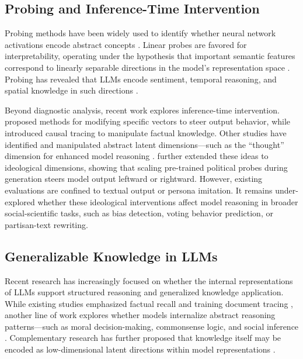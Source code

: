 \documentclass[11pt]{article}
\begin{document}
\subsection{Probing and Inference-Time Intervention}

Probing methods have been widely used to identify whether neural network activations encode abstract concepts \citep{alainUnderstandingIntermediateLayers2016, belinkovProbingClassifiersPromises2022}. Linear probes are favored for interpretability, operating under the hypothesis that important semantic features correspond to linearly separable directions in the model’s representation space \citep{mikolov-etal-2013-linguistic, parkLinearRepresentationHypothesis2024}. Probing has revealed that LLMs encode sentiment, temporal reasoning, and spatial knowledge in such directions \citep{tiggesLinearRepresentationsSentiment2023, gurneeLanguageModelsRepresent2023, nandaEmergentLinearRepresentations2023, goldowsky-dillDetectingStrategicDeception2025}.

Beyond diagnostic analysis, recent work explores inference-time intervention. \citet{liInferenceTimeInterventionEliciting2023} proposed methods for modifying specific vectors to steer output behavior, while \citet{marksGeometryTruthEmergent2023} introduced causal tracing to manipulate factual knowledge. Other studies have identified and manipulated abstract latent dimensions—such as the “thought” dimension for enhanced model reasoning \citep{wangThoughtProbeClassifierGuidedThought2025}. \citet{kimLinearRepresentationsPolitical2025} further extended these ideas to ideological dimensions, showing that scaling pre-trained political probes during generation steers model output leftward or rightward. However, existing evaluations are confined to textual output or persona imitation. It remains under-explored whether these ideological interventions affect model reasoning in broader social-scientific tasks, such as bias detection, voting behavior prediction, or partisan-text rewriting.

\subsection{Generalizable Knowledge in LLMs}

Recent research has increasingly focused on whether the internal representations of LLMs support structured reasoning and generalized knowledge application. While existing studies emphasized factual recall and training document tracing \citep{petroniLanguageModelsKnowledge2019, liuOLMoTraceTracingLanguage2025}, another line of work explores whether models internalize abstract reasoning patterns—such as moral decision-making, commonsense logic, and social inference \citep{ganguliCapacityMoralSelfCorrection2023, sapSocialBiasFrames2020}. Complementary research has further proposed that knowledge itself may be encoded as low-dimensional latent directions within model representations \citep{ju-etal-2024-large}.
\end{document}
